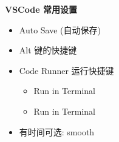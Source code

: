\textbf{VSCode 常用设置}
\begin{itemize}
    \item Auto Save (自动保存)
    \item Alt 键的快捷键
    \item Code Runner 运行快捷键
    \begin{itemize}
        \item Run in Terminal
        \item Run in Terminal
    \end{itemize}
    \item 有时间可选: smooth
\end{itemize}
